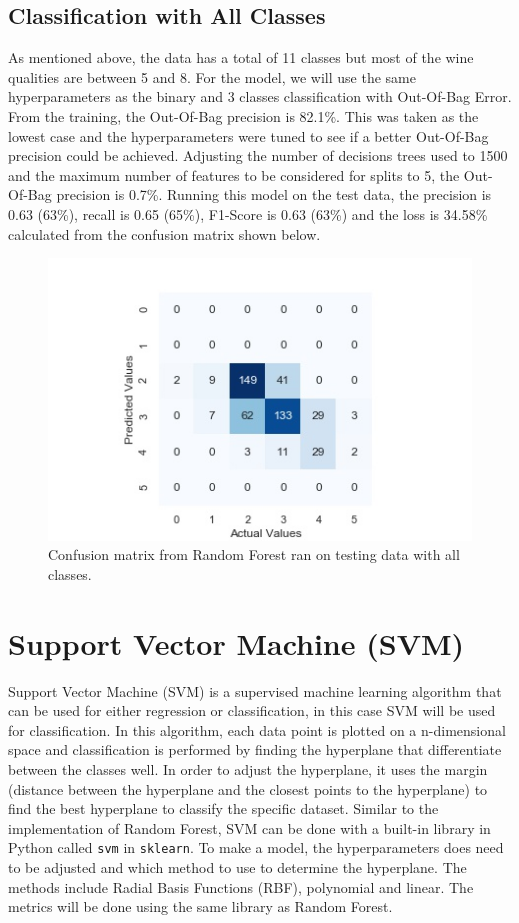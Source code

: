\documentclass[11pt,a4paper,titlepage]{article}
\begin{document}
	\subsection{Classification with All Classes}
	As mentioned above, the data has a total of 11 classes but most of the wine qualities are between 5 and 8. For the model, we will use the same hyperparameters as the binary and 3 classes classification with Out-Of-Bag Error. From the training, the Out-Of-Bag precision is 82.1\%. This was taken as the lowest case and the hyperparameters were tuned to see if a better Out-Of-Bag precision could be achieved. Adjusting the number of decisions trees used to 1500 and the maximum number of features to be considered for splits to 5, the Out-Of-Bag precision is 0.7\%. Running this model on the test data, the precision is 0.63 (63\%), recall is 0.65  (65\%), F1-Score is 0.63 (63\%) and the loss is 34.58\% calculated from the confusion matrix shown below.
	\begin{figure}[H]
		\centering
		\includegraphics[scale=0.6]{img/allclass_rf.jpg}
		\caption{Confusion matrix from Random Forest ran on testing data with all classes.}
	\end{figure}
	\section{Support Vector Machine (SVM)}
	Support Vector Machine (SVM) is a supervised machine learning algorithm that can be used for either regression or classification, in this case SVM will be used for classification. In this algorithm, each data point is plotted on a n-dimensional space and classification is performed by finding the hyperplane that differentiate between the classes well. In order to adjust the hyperplane, it uses the margin (distance between the hyperplane and the closest points to the hyperplane) to find the best hyperplane to classify the specific dataset. Similar to the implementation of Random Forest, SVM can be done with a built-in library in Python called \texttt{svm} in \texttt{sklearn}. To make a model, the hyperparameters does need to be adjusted and which method to use to determine the hyperplane. The methods include Radial Basis Functions (RBF), polynomial and linear. The metrics will be done using the same library as Random Forest.
\end{document}
